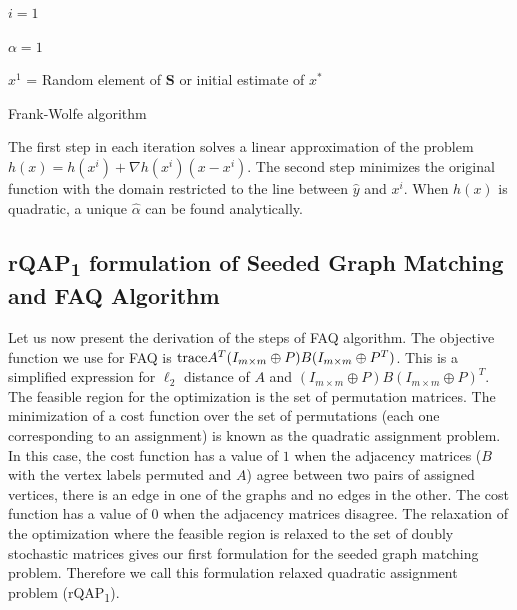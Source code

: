 \documentclass[12pt,oneside,final]{thesis}
\begin{document}
\begin{algorithm}[H]
 \SetAlgoLined
 $i=1$\;
 
 $\alpha=1$\;
 
 $x^1$ = Random element of   $\mathbf{S}$  or initial estimate of $\mathit{x^*}$ \;
 
 \caption{Frank-Wolfe algorithm}
\end{algorithm}

The first step in each iteration solves a linear approximation of the problem $h(x)=h(x^i)+\nabla{h(x^i)}(x-x^i)$. The second step minimizes the original function with the domain restricted to the line between $\hat{y}$ and $x^{i}$. When $h(x)$ is quadratic, a unique  $\hat{\alpha}$ can be found analytically.

\subsection{rQAP\textsubscript{1} formulation of Seeded Graph Matching and FAQ Algorithm}
Let us now present the derivation of the steps of  FAQ algorithm.  The objective function we use for FAQ is $\textup{trace} {A^T(I_{m \times m}\oplus P)B(I_{m \times m}\oplus P^T)}$. This is a simplified expression for $\ell_2$ distance of $A$ and $(I_{m \times m}\oplus P)B(I_{m \times m}\oplus P)^T$. The feasible region for the optimization is the set of permutation matrices. The minimization of  a cost function over the set of permutations (each one corresponding to an assignment) is known as the quadratic assignment problem. In this case, the cost function has a value of $1$ when the adjacency matrices ($B$ with the vertex labels  permuted and  $A$) agree \ie between two pairs of assigned vertices, there is an edge in one of the graphs and no edges in the other.  The cost function has a value of $0$ when the adjacency matrices disagree.
The relaxation of the optimization where the feasible region is relaxed to the set of doubly stochastic matrices gives our first formulation for the seeded graph matching problem. Therefore we call this formulation relaxed quadratic assignment problem (rQAP\textsubscript{1}).
\end{document}
